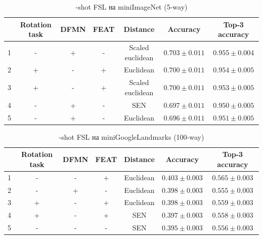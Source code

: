 \documentclass[a4paper, 12pt]{report}
\begin{document}
\begin{table}[H]
\begin{adjustbox}{center}
\begin{tabular}{| r | c c c c | c |  c | }
\hline
    & Rotation task   & DFMN   & FEAT   & Distance         & Accuracy         & Top-3 accuracy   \\
    
    \hline
  1 & -               & +      & -      & Scaled euclidean & $0.703 \pm 0.011$ & $0.955 \pm 0.004$ \\
    \hline
  2 & +               & -      & +      & Euclidean        & $0.700 \pm 0.011$ & $0.954 \pm 0.005$ \\
    \hline
  3 & +               & -      & +      & Scaled euclidean & $0.700 \pm 0.011$ & $0.953 \pm 0.005$ \\
    \hline
  4 & -               & +      & -      & SEN              & $0.697 \pm 0.011$ & $0.950 \pm 0.005$ \\
    \hline
  5 & -               & +      & -      & Euclidean        & $0.696 \pm 0.011$ & $0.951 \pm 0.005$ \\
\hline
\end{tabular}
\end{adjustbox}
\caption{-shot FSL на miniImageNet (5-way)}
\end{table}
 
  \begin{table}[H]
\begin{adjustbox}{center}
\begin{tabular}{| r | c c c c | c |  c | }
\hline
    & Rotation task   & DFMN   & FEAT   & Distance         & Accuracy         & Top-3 accuracy   \\
    \hline
  1 & -               & -      & +      & Euclidean        & $0.403 \pm 0.003$ & $0.565 \pm 0.003$ \\
    \hline
  2 & -               & +      & -      & Euclidean        & $0.398 \pm 0.003$ & $0.555 \pm 0.003$ \\
    \hline
  3 & +               & -      & +      & Euclidean        & $0.398 \pm 0.003$ & $0.559 \pm 0.003$ \\
    \hline
  4 & +               & -      & +      & SEN              & $0.397 \pm 0.003$ & $0.558 \pm 0.003$ \\
    \hline
  5 & -               & -      & -      & SEN              & $0.395 \pm 0.003$ & $0.556 \pm 0.003$ \\
\hline
\end{tabular}
\end{adjustbox}
\caption{-shot FSL на miniGoogleLandmarks (100-way)}
\end{table}
 
\end{document}
